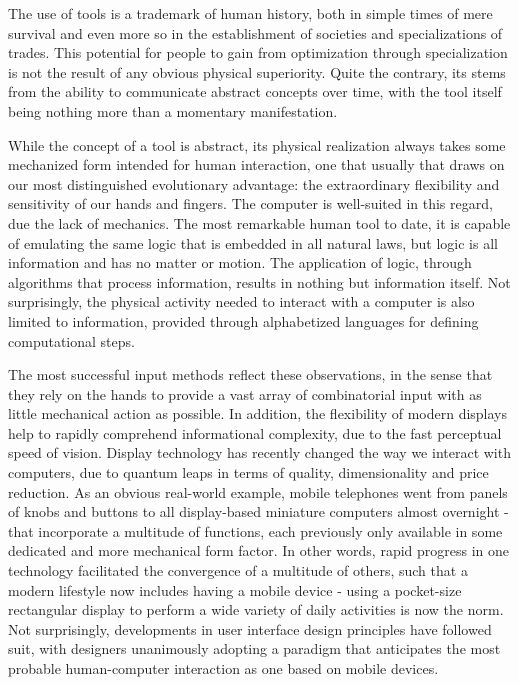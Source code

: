 	
	
\noi The use of tools is a  trademark of human history, both in simple times of mere survival and even more so in the establishment of societies and specializations of trades. This potential for people to gain from optimization through specialization is not the result of any obvious physical superiority. Quite the contrary, its stems from the ability to communicate abstract concepts over time, with the tool itself being nothing more than a momentary manifestation.

While the concept of a tool is abstract, its physical realization always takes some mechanized form intended for human interaction, one that usually  that draws on our most distinguished evolutionary advantage: the extraordinary  flexibility  and sensitivity of our hands and fingers. The computer is well-suited in this regard, due the lack of mechanics. The most remarkable human tool to date, it is capable of emulating the same logic that is embedded in all natural laws, but logic is all information and has no matter or motion. The application of logic, through algorithms that process  information, results in nothing but information itself. Not surprisingly, the physical activity needed to interact with a computer is also limited to information, provided through alphabetized languages for defining computational steps.


The most successful input methods reflect these observations, in the sense that they rely on the hands  to provide a vast array of combinatorial input with as little mechanical action as possible. In addition, the flexibility of modern displays help to rapidly  comprehend informational complexity, due to the fast perceptual speed of vision. Display technology has recently changed the way we interact with computers, due to quantum leaps in terms of quality, dimensionality and price reduction. As an obvious real-world example, mobile telephones  went from  panels of knobs and buttons to all display-based  miniature computers almost overnight  -  that  incorporate a multitude of functions, each previously only available in some dedicated and more mechanical form factor. In other words, rapid progress in one technology facilitated the convergence of a multitude of others, such that a modern lifestyle now includes having a mobile device - using a pocket-size rectangular display to perform a wide variety of daily activities is now the norm. Not surprisingly, developments in user interface design principles have followed suit, with designers unanimously adopting a \cite{MobileFirst} paradigm that anticipates the most probable human-computer interaction as one based on mobile devices.

